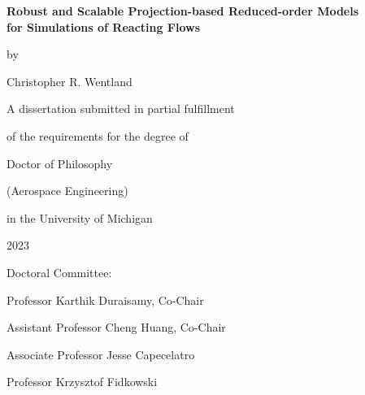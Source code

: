 \thispagestyle{empty}

\begin{singlespace}
\begin{center}

	\textbf{Robust and Scalable Projection-based Reduced-order Models \\for Simulations of Reacting Flows}

	\vspace{2em}

	by

	\vspace{2em}

    Christopher R. Wentland

	\vspace{6em}

	A dissertation submitted in partial fulfillment

	of the requirements for the degree of

	Doctor of Philosophy

	(Aerospace Engineering)

	in the University of Michigan

	2023

\end{center}

\vspace{8em}

Doctoral Committee:

\vspace{1em}

\hspace{3em}Professor Karthik Duraisamy, Co-Chair

\hspace{3em}Assistant Professor Cheng Huang, Co-Chair

\hspace{3em}Associate Professor Jesse Capecelatro

\hspace{3em}Professor Krzysztof Fidkowski

\end{singlespace}
\restoregeometry